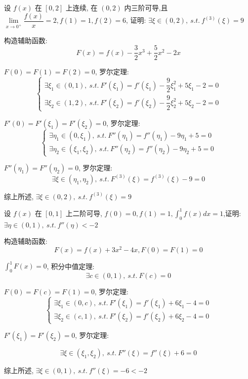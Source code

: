 \begin{proposition}
	设 $f(x)$ 在 $[0,2]$ 上连续, 在 $(0,2)$ 内三阶可导,且 $\lim\limits_{x\to 0^{+}}\dfrac{f(x)}{x}=2,f(1)=1,f(2)=6$, 证明: $\exists \xi\in(0,2),\ s.t.\ f^{(3)}(\xi)=9$
\end{proposition}
\begin{solution}

	构造辅助函数: 
	$$F(x)=f(x)-\dfrac{3}{2}x^3+\dfrac{5}{2}x^2-2x$$

	$F(0)=F(1)=F(2)=0$, 罗尔定理:
	$$\begin{cases}
		\exists \xi_{1}\in(0,1),\ s.t.\ F'(\xi_{1})=f'(\xi_{1})-\dfrac{9}{2}\xi_{1}^2+5\xi_{1}-2=0 \\
		\exists \xi_{2}\in(1,2),\ s.t.\ F'(\xi_{2})=f'(\xi_{2})-\dfrac{9}{2}\xi_{2}^2+5\xi_{2}-2=0
	\end{cases}$$

	$F'(0) = F'(\xi_{1}) = F'(\xi_{2}) = 0$, 罗尔定理:
	$$\begin{cases}
		\exists \eta_{1}\in(0,\xi_{1}),\ s.t.\ F''(\eta_{1})=f''(\eta_{1})-9\eta_{1}+5=0 \\
		\exists \eta_{2}\in(\xi_{1},\xi_{2}),\ s.t.\ F''(\eta_{2})=f''(\eta_{2})-9\eta_{2}+5=0
	\end{cases}$$

	$F''(\eta_{1}) = F''(\eta_{2}) = 0$, 罗尔定理:
	$$\exists \xi\in(\eta_{1},\eta_{2}),\ s.t.\ F^{(3)}(\xi)=f^{(3)}(\xi)-9=0$$

	综上所述, $\exists \xi\in(0,2),\ s.t.\ f^{(3)}(\xi)=9$
\end{solution}

\begin{proposition}
	设 $f(x)$ 在 $[0,1]$ 上二阶可导, $f(0)=0,f(1)=1,\displaystyle{\int_{0}^{1}f(x)dx=1}$,证明: $\exists \eta\in(0,1),\ s.t.\ f''(\eta)<-2$
\end{proposition}
\begin{solution}

	构造辅助函数: 
	$$F(x)=f(x)+3x^2-4x, F(0) = F(1) = 0$$

	$\displaystyle{\int_{0}^{1}F(x)=0}$, 积分中值定理:
	$$\exists c\in(0,1), \ s.t.\ F(c)=0$$

	$F(0) = F(c) = F(1) = 0$, 罗尔定理:
	$$\begin{cases}
		\exists \xi_{1}\in(0,c),\ s.t.\ F'(\xi_{1})=f'(\xi_{1})+6\xi_{1}-4=0 \\
		\exists \xi_{2}\in(c,1),\ s.t.\ F'(\xi_{2})=f'(\xi_{2})+6\xi_{2}-4=0
	\end{cases}$$

	$F'(\xi_{1}) = F'(\xi_{2}) = 0$, 罗尔定理:

	$$\exists \xi\in(\xi_{1},\xi_{2}),\ s.t.\ F''(\xi)=f''(\xi)+6=0$$

	综上所述, $\exists \xi\in(0,1),\ s.t.\ f''(\xi)=-6<-2$
\end{solution}

